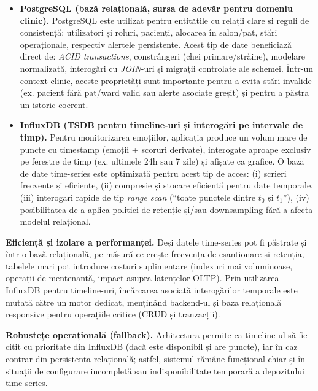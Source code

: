 \begin{itemize}
  \item \textbf{PostgreSQL (bază relațională, sursa de adevăr pentru domeniu clinic).}
  PostgreSQL este utilizat pentru entitățile cu relații clare și reguli de consistență: utilizatori și roluri,
  pacienți, alocarea în salon/pat, stări operaționale, respectiv alertele persistente. Acest tip de date beneficiază direct de:
  \textit{ACID transactions}, constrângeri (chei primare/străine), modelare normalizată, interogări cu \textit{JOIN}-uri și
  migrații controlate ale schemei. Într-un context clinic, aceste proprietăți sunt importante pentru a evita stări invalide
  (ex. pacient fără pat/ward valid sau alerte asociate greșit) și pentru a păstra un istoric coerent.

  \item \textbf{InfluxDB (TSDB pentru timeline-uri și interogări pe intervale de timp).}
  Pentru monitorizarea emoțiilor, aplicația produce un volum mare de puncte cu timestamp (emoții + scoruri derivate),
  interogate aproape exclusiv pe ferestre de timp (ex. ultimele 24h sau 7 zile) și afișate ca grafice.
  O bază de date time-series este optimizată pentru acest tip de acces:
  (i) scrieri frecvente și eficiente, (ii) compresie și stocare eficientă pentru date temporale,
  (iii) interogări rapide de tip \textit{range scan} (``toate punctele dintre $t_0$ și $t_1$''),
  (iv) posibilitatea de a aplica politici de retenție și/sau downsampling fără a afecta modelul relațional.
\end{itemize}

\noindent\textbf{Eficiență și izolare a performanței.}
Deși datele time-series pot fi păstrate și într-o bază relațională, pe măsură ce crește frecvența de eșantionare și retenția, tabelele mari pot introduce costuri suplimentare (indexuri mai voluminoase, operații de mentenanță, impact asupra latențelor OLTP). Prin utilizarea InfluxDB pentru timeline-uri, încărcarea asociată interogărilor temporale este mutată către un motor dedicat, menținând backend-ul și baza relațională responsive pentru operațiile critice (CRUD și tranzacții).

\noindent\textbf{Robustețe operațională (fallback).}
Arhitectura permite ca timeline-ul să fie citit cu prioritate din InfluxDB (dacă este disponibil și are puncte),
iar în caz contrar din persistența relațională; astfel, sistemul rămâne funcțional chiar și în situații de configurare incompletă
sau indisponibilitate temporară a depozitului time-series.

